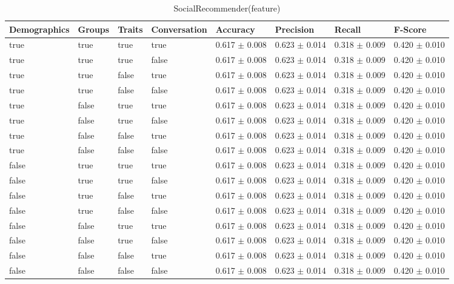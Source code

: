 \clearpage
\begin{table}[h]
	\centering
	\begin{tabular}{|l|l|l|l|l|l|l|l|} %
	\hline
	Demographics & Groups & Traits & Conversation & Accuracy & Precision & Recall & F-Score \\ \hline
	true & true & true & true & 0.617	\( \pm \) 0.008	& 0.623	\( \pm \) 0.014	& 0.318	\( \pm \) 0.009	& 0.420	\( \pm \) 0.010	\\ \hline
	true & true & true & false & 0.617	\( \pm \) 0.008	& 0.623	\( \pm \) 0.014	& 0.318	\( \pm \) 0.009	& 0.420	\( \pm \) 0.010	\\ \hline
	true & true & false & true & 0.617	\( \pm \) 0.008	& 0.623	\( \pm \) 0.014	& 0.318	\( \pm \) 0.009	& 0.420	\( \pm \) 0.010	\\ \hline
	true & true & false & false & 0.617	\( \pm \) 0.008	& 0.623	\( \pm \) 0.014	& 0.318	\( \pm \) 0.009	& 0.420	\( \pm \) 0.010	\\ \hline
	true & false & true & true & 0.617	\( \pm \) 0.008	& 0.623	\( \pm \) 0.014	& 0.318	\( \pm \) 0.009	& 0.420	\( \pm \) 0.010	\\ \hline
	true & false & true & false & 0.617	\( \pm \) 0.008	& 0.623	\( \pm \) 0.014	& 0.318	\( \pm \) 0.009	& 0.420	\( \pm \) 0.010	\\ \hline
	true & false & false & true & 0.617	\( \pm \) 0.008	& 0.623	\( \pm \) 0.014	& 0.318	\( \pm \) 0.009	& 0.420	\( \pm \) 0.010	\\ \hline
	true & false & false & false & 0.617	\( \pm \) 0.008	& 0.623	\( \pm \) 0.014	& 0.318	\( \pm \) 0.009	& 0.420	\( \pm \) 0.010	\\ \hline
	false & true & true & true & 0.617	\( \pm \) 0.008	& 0.623	\( \pm \) 0.014	& 0.318	\( \pm \) 0.009	& 0.420	\( \pm \) 0.010	\\ \hline
	false & true & true & false & 0.617	\( \pm \) 0.008	& 0.623	\( \pm \) 0.014	& 0.318	\( \pm \) 0.009	& 0.420	\( \pm \) 0.010	\\ \hline
	false & true & false & true & 0.617	\( \pm \) 0.008	& 0.623	\( \pm \) 0.014	& 0.318	\( \pm \) 0.009	& 0.420	\( \pm \) 0.010	\\ \hline
	false & true & false & false & 0.617	\( \pm \) 0.008	& 0.623	\( \pm \) 0.014	& 0.318	\( \pm \) 0.009	& 0.420	\( \pm \) 0.010	\\ \hline
	false & false & true & true & 0.617	\( \pm \) 0.008	& 0.623	\( \pm \) 0.014	& 0.318	\( \pm \) 0.009	& 0.420	\( \pm \) 0.010	\\ \hline
	false & false & true & false & 0.617	\( \pm \) 0.008	& 0.623	\( \pm \) 0.014	& 0.318	\( \pm \) 0.009	& 0.420	\( \pm \) 0.010	\\ \hline
	false & false & false & true & 0.617	\( \pm \) 0.008	& 0.623	\( \pm \) 0.014	& 0.318	\( \pm \) 0.009	& 0.420	\( \pm \) 0.010	\\ \hline
	false & false & false & false & 0.617	\( \pm \) 0.008	& 0.623	\( \pm \) 0.014	& 0.318	\( \pm \) 0.009	& 0.420	\( \pm \) 0.010	\\ \hline
	\end{tabular}
	\caption{SocialRecommender(feature)}
	\label{tab:revpol}
\end{table}

